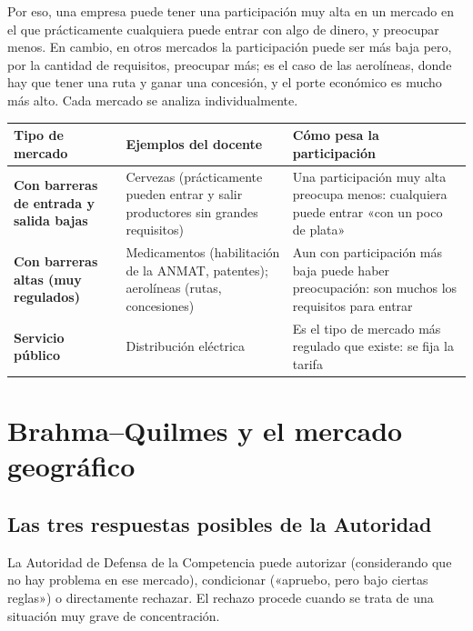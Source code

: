 \documentclass[12pt,oneside]{book}
\begin{document}
Por eso, una empresa puede tener una participación muy alta en un mercado en el que prácticamente cualquiera puede entrar con algo de dinero, y preocupar menos. En cambio, en otros mercados la participación puede ser más baja pero, por la cantidad de requisitos, preocupar más; es el caso de las aerolíneas, donde hay que tener una ruta y ganar una concesión, y el porte económico es mucho más alto. Cada mercado se analiza individualmente.

\begin{table}[H]
\centering
\renewcommand{\arraystretch}{1.25}
\begin{tabularx}{\textwidth}{
    >{\raggedright\arraybackslash}p{}
    >{\raggedright\arraybackslash}X
    >{\raggedright\arraybackslash}X
}
\toprule
\textbf{Tipo de mercado} & \textbf{Ejemplos del docente} & \textbf{Cómo pesa la participación} \\
\midrule
\textbf{Con barreras de entrada y salida bajas} & Cervezas (prácticamente pueden entrar y salir productores sin grandes requisitos) & Una participación muy alta preocupa menos: cualquiera puede entrar «con un poco de plata» \\
\textbf{Con barreras altas (muy regulados)} & Medicamentos (habilitación de la ANMAT, patentes); aerolíneas (rutas, concesiones) & Aun con participación más baja puede haber preocupación: son muchos los requisitos para entrar \\
\textbf{Servicio público} & Distribución eléctrica & Es el tipo de mercado más regulado que existe: se fija la tarifa \\
\bottomrule
\end{tabularx}
\end{table}

\section{Brahma--Quilmes y el mercado geográfico}

\subsection{Las tres respuestas posibles de la Autoridad}

La Autoridad de Defensa de la Competencia puede autorizar (considerando que no hay problema en ese mercado), condicionar («apruebo, pero bajo ciertas reglas») o directamente rechazar. El rechazo procede cuando se trata de una situación muy grave de concentración.
\end{document}
